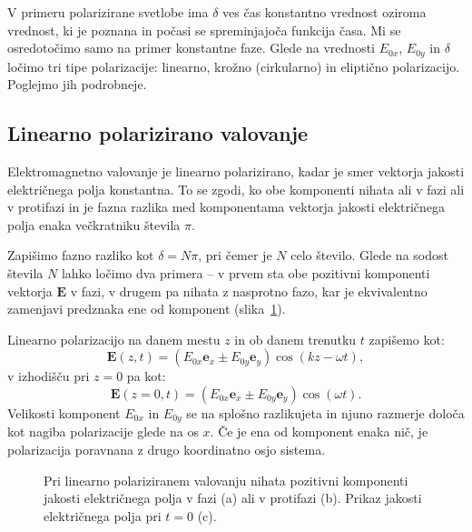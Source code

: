 V primeru polarizirane svetlobe ima $\delta$ ves čas konstantno 
vrednost oziroma vrednost, ki je poznana in počasi se spreminjajoča 
funkcija časa. Mi se osredotočimo samo na primer konstantne faze. 
Glede na vrednosti $E_{0x}$, $E_{0y}$ in $\delta$ ločimo tri tipe
polarizacije: linearno, krožno (cirkularno) in eliptično polarizacijo. 
Poglejmo jih podrobneje.

\subsection*{Linearno polarizirano valovanje}
Elektromagnetno valovanje je linearno polarizirano, kadar je smer vektorja
jakosti električnega polja konstantna. To se zgodi, ko obe komponenti nihata
ali v fazi ali v protifazi in je fazna razlika med komponentama vektorja 
jakosti električnega polja enaka večkratniku števila $\pi$. 

Zapišimo fazno razliko kot $\delta = N\pi$, pri čemer je $N$ celo število. 
Glede na sodost števila $N$ lahko ločimo dva primera -- v prvem sta obe pozitivni komponenti
vektorja $\mathbf{E}$ v fazi, v drugem pa nihata z nasprotno fazo, kar je ekvivalentno
zamenjavi predznaka ene od komponent (slika~\ref{fig:03_linpol}). 

Linearno polarizacijo na danem mestu $z$ in ob danem trenutku $t$ zapišemo
kot:
\begin{equation}
\mathbf{E} (z, t) = \left( E_{0x} \mathbf{e}_x \pm E_{0y} \mathbf{e}_y \right)
\cos \left(kz - \omega t\right)\!,
\label{eq:03_38}
\end{equation}
v izhodišču pri $z=0$ pa kot:
\begin{equation}
\mathbf{E} (z=0, t) = \left( E_{0x} \mathbf{e}_x \pm E_{0y} \mathbf{e}_y \right)
\cos \left(\omega t\right)\!.
\label{eq:03_39}
\end{equation}
Velikosti komponent $E_{0x}$ in $E_{0y}$ se na splošno razlikujeta in njuno razmerje
določa kot nagiba polarizacije glede na os $x$. Če je ena od komponent enaka nič, je 
polarizacija poravnana z drugo koordinatno osjo sistema.

\begin{figure}[ht]
\centering
\def\svgwidth{140truemm} 

\caption{Pri linearno polariziranem valovanju nihata pozitivni komponenti jakosti
električnega polja v fazi (a) ali v protifazi (b). Prikaz jakosti električnega polja
pri $t=0$ (c).}
\label{fig:03_linpol}
\end{figure}

